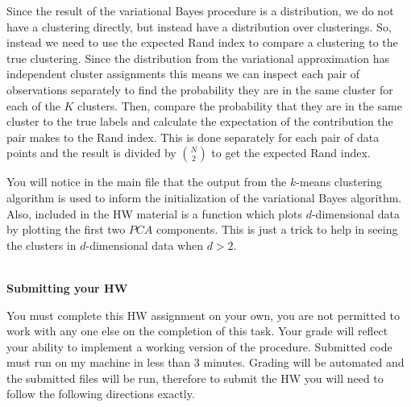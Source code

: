 \documentclass[12pt]{article}
\begin{document}
{\noindent Since the result of the variational Bayes procedure is a distribution, we do not have a clustering directly, but instead have a distribution over clusterings.  So, instead we need to use the expected  Rand index to compare a clustering to the true clustering.  Since the distribution from the variational approximation has independent cluster assignments this means we can inspect each pair of observations separately to find the probability they are in the same cluster for each of the $K$ clusters.  Then, compare the probability that they are in the same cluster to the true labels and calculate the expectation of the contribution the pair makes to the  Rand index.  This is done separately for each pair of data points and the result is divided by ${N \choose 2}$ to get the expected  Rand index.

 You will notice in the main file that the output from the $k$-means clustering algorithm is used to inform the initialization of the variational Bayes algorithm.  Also, included in the HW material is a function which plots $d$-dimensional data by plotting the first two $PCA$ components.  This is just a trick to help in seeing the clusters in $d$-dimensional data when $d > 2$.\\ \\}

{\bf Submitting your HW}

You must complete this HW assignment on your own, you are not permitted to work with any one else on the completion of this task.  Your grade will reflect your ability to implement a working version of the procedure.  Submitted code must run on my machine in less than 3 minutes.  Grading will be automated and the submitted files will be run, therefore to submit the HW you will need to follow the following directions exactly.
\end{document}
